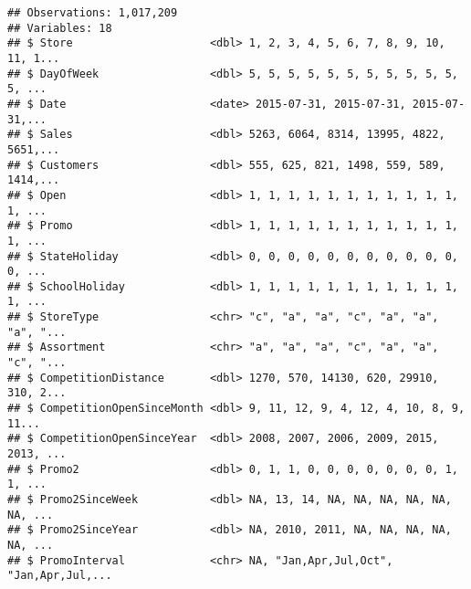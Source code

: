 \documentclass[]{article}
\newenvironment{Shaded}{\begin{snugshade}}{\end{snugshade}}
\newcommand{\KeywordTok}[1]{\textcolor[rgb]{0.13,0.29,0.53}{\textbf{#1}}}
\newcommand{\NormalTok}[1]{#1}
\newcommand{\OperatorTok}[1]{\textcolor[rgb]{0.81,0.36,0.00}{\textbf{#1}}}
\newcommand{\StringTok}[1]{\textcolor[rgb]{0.31,0.60,0.02}{#1}}
\begin{document}
\begin{verbatim}
## Observations: 1,017,209
## Variables: 18
## $ Store                     <dbl> 1, 2, 3, 4, 5, 6, 7, 8, 9, 10, 11, 1...
## $ DayOfWeek                 <dbl> 5, 5, 5, 5, 5, 5, 5, 5, 5, 5, 5, 5, ...
## $ Date                      <date> 2015-07-31, 2015-07-31, 2015-07-31,...
## $ Sales                     <dbl> 5263, 6064, 8314, 13995, 4822, 5651,...
## $ Customers                 <dbl> 555, 625, 821, 1498, 559, 589, 1414,...
## $ Open                      <dbl> 1, 1, 1, 1, 1, 1, 1, 1, 1, 1, 1, 1, ...
## $ Promo                     <dbl> 1, 1, 1, 1, 1, 1, 1, 1, 1, 1, 1, 1, ...
## $ StateHoliday              <dbl> 0, 0, 0, 0, 0, 0, 0, 0, 0, 0, 0, 0, ...
## $ SchoolHoliday             <dbl> 1, 1, 1, 1, 1, 1, 1, 1, 1, 1, 1, 1, ...
## $ StoreType                 <chr> "c", "a", "a", "c", "a", "a", "a", "...
## $ Assortment                <chr> "a", "a", "a", "c", "a", "a", "c", "...
## $ CompetitionDistance       <dbl> 1270, 570, 14130, 620, 29910, 310, 2...
## $ CompetitionOpenSinceMonth <dbl> 9, 11, 12, 9, 4, 12, 4, 10, 8, 9, 11...
## $ CompetitionOpenSinceYear  <dbl> 2008, 2007, 2006, 2009, 2015, 2013, ...
## $ Promo2                    <dbl> 0, 1, 1, 0, 0, 0, 0, 0, 0, 0, 1, 1, ...
## $ Promo2SinceWeek           <dbl> NA, 13, 14, NA, NA, NA, NA, NA, NA, ...
## $ Promo2SinceYear           <dbl> NA, 2010, 2011, NA, NA, NA, NA, NA, ...
## $ PromoInterval             <chr> NA, "Jan,Apr,Jul,Oct", "Jan,Apr,Jul,...
\end{verbatim}

\begin{Shaded}
\end{Shaded}
\end{document}
